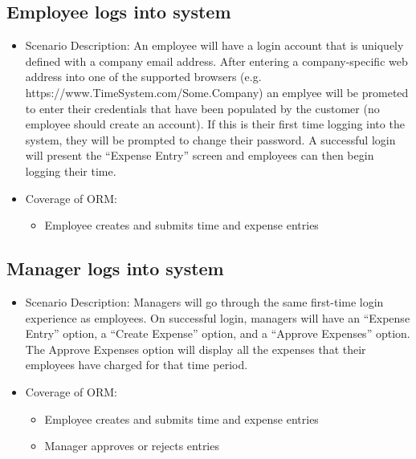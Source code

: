 \documentclass[12pt]{article}
\begin{document}
\subsection{ Employee logs into system}
\begin{itemize}
\item Scenario Description:
An employee will have a login account that is uniquely defined with a company email address. After entering a company-specific web address into one of the supported browsers (e.g. https://www.TimeSystem.com/Some.Company) an emplyee will be prometed to enter their credentials that have been populated by the customer (no employee should create an account). If this is their first time logging into the system, they will be prompted to change their password. A successful login will present the “Expense Entry” screen and employees can then begin logging their time.
\item Coverage of ORM:
\begin{itemize}
\item Employee creates and submits time and expense entries
\end{itemize}
\end{itemize}

\subsection{ Manager logs into system}
\begin{itemize}
\item Scenario Description: Managers will go through the same first-time login experience as employees. On successful login, managers will have an “Expense Entry” option, a “Create Expense” option, and a “Approve Expenses” option. The Approve Expenses option will display all the expenses that their employees have charged for that time period.
\item Coverage of ORM:
\begin{itemize}
\item Employee creates and submits time and expense entries
\item Manager approves or rejects entries
\end{itemize}
\end{itemize}
\end{document}
